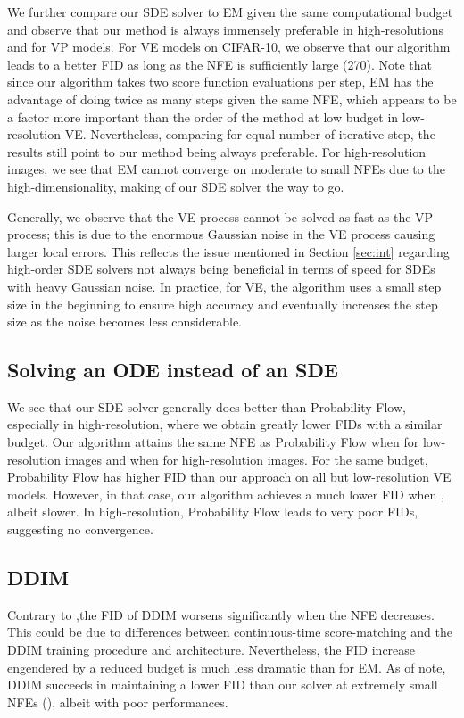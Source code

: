 \documentclass{article}
\begin{document}
We further compare our SDE solver to EM given the same computational budget and observe that our method is always immensely preferable in high-resolutions and for VP models. For VE models on CIFAR-10, we observe that our algorithm leads to a better FID as long as the NFE is sufficiently large (270).
Note that since our algorithm takes two score function evaluations per step, EM has the advantage of doing twice as many steps given the same NFE, which appears to be a factor more important than the order of the method at low budget in low-resolution VE. 
Nevertheless, comparing for equal number of iterative step, the results still point to our method being always preferable.
For high-resolution images, we see that EM cannot converge on moderate to small NFEs due to the high-dimensionality, making of our SDE solver the way to go.


Generally, we observe that the VE process cannot be solved as fast as the VP process; this is due to the enormous Gaussian noise in the VE process causing larger local errors. This reflects the issue mentioned in Section \ref{sec:int} regarding high-order SDE solvers not always being beneficial in terms of speed for SDEs with heavy Gaussian noise. In practice, for VE, the algorithm uses a small step size in the beginning to ensure high accuracy and eventually increases the step size as the noise becomes less considerable.

\subsection{Solving an ODE instead of an SDE} We see that our SDE solver generally does better than Probability Flow, especially in high-resolution, where we obtain greatly lower FIDs with a similar budget. Our algorithm attains the same NFE as Probability Flow when  for low-resolution images and when  for high-resolution images. For the same budget, Probability Flow has higher FID than our approach on all but low-resolution VE models. However, in that case, our algorithm achieves a much lower FID when , albeit slower. In high-resolution, Probability Flow leads to very poor FIDs, suggesting no convergence.

\subsection{DDIM} Contrary to \citet{song2020denoising},the FID of DDIM worsens significantly when the NFE decreases. This could be due to differences between \citet{song2020score} continuous-time score-matching and the DDIM training procedure and architecture. Nevertheless, the FID increase engendered by a reduced budget is much less dramatic than for EM. As of note, DDIM succeeds in maintaining a lower FID than our solver at extremely small NFEs (), albeit with poor performances.
\end{document}
